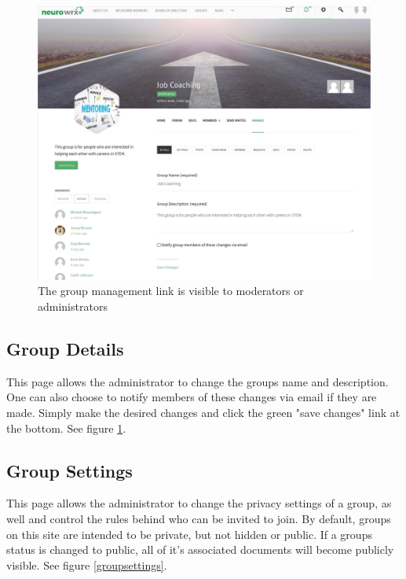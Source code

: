 \documentclass[10pt]{article}
\begin{document}
\begin{figure}[H]
    \centering
    \includegraphics[scale=0.25]{images/groupmanage.jpg}
    \caption{The group management link is visible to moderators or administrators}
    \label{groupmanagelink}
\end{figure}

\subsection{Group Details}

\begin{flushleft}
This page allows the administrator to change the groups name and description.  One can also choose to notify members of these changes via email if they are made.  Simply make the desired changes and click the green "save changes" link at the bottom.  See figure \ref{groupmanagelink}.
\end{flushleft}

\subsection{Group Settings}

\begin{flushleft}
This page allows the administrator to change the privacy settings of a group, as well and control the rules behind who can be invited to join.  By default, groups on this site are intended to be private, but not hidden or public.  If a groups status is changed to public, all of it's associated documents will become publicly visible. See figure \ref{groupsettings}.
\end{flushleft}
\end{document}
